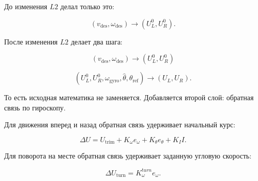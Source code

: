\documentclass[12pt,a4paper]{article}
\newcommand{\vdes}{v_{\mathrm{des}}}
\newcommand{\wdes}{\omega_{\mathrm{des}}}
\newcommand{\wgyro}{\omega_{\mathrm{gyro}}}
\newcommand{\thetahat}{\hat{\theta}}
\newcommand{\thetaref}{\theta_{\mathrm{ref}}}
\begin{document}
До изменения \(L2\) делал только это:

\[
(\vdes,\wdes)
\longrightarrow
(U_L^0,U_R^0).
\]

После изменения \(L2\) делает два шага:

\[
(\vdes,\wdes)
\longrightarrow
(U_L^0,U_R^0)
\]

\[
(U_L^0,U_R^0,\wgyro,\thetahat,\thetaref)
\longrightarrow
(U_L,U_R).
\]

То есть исходная математика не заменяется. Добавляется второй слой:
обратная связь по гироскопу.

Для движения вперед и назад обратная связь удерживает начальный курс:

\[
\Delta U =
U_{\mathrm{trim}}
+ K_\omega e_\omega
+ K_\theta e_\theta
+ K_I I.
\]

Для поворота на месте обратная связь удерживает заданную угловую скорость:

\[
\Delta U_{\mathrm{turn}} =
K_\omega^{turn} e_\omega.
\]
\end{document}
